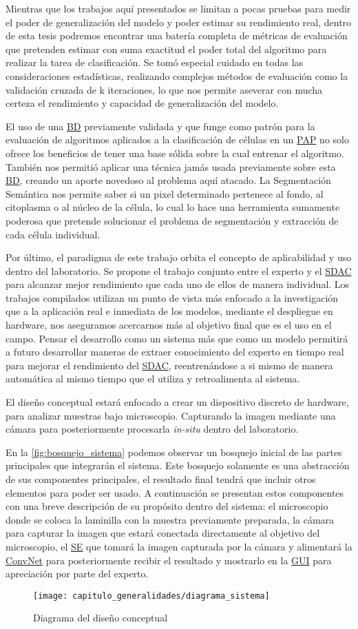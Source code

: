 Mientras que los trabajos aquí presentados se limitan a pocas pruebas para medir
el poder de generalización del modelo y poder estimar su rendimiento real,
dentro de esta tesis podremos encontrar una batería completa de métricas de
evaluación que pretenden estimar con suma exactitud el poder total del algoritmo
para realizar la tarea de clasificación. Se tomó especial cuidado en todas las
consideraciones estadísticas, realizando complejos métodos de evaluación como la
validación cruzada de k iteraciones, lo que nos permite aseverar con mucha
certeza el rendimiento y capacidad de generalización del modelo.

El uso de una \hyperlink{abbr}{BD} previamente validada y que funge como patrón
para la evaluación de algoritmos aplicados a la clasificación de células en un
\hyperlink{abbr}{PAP} no solo ofrece los beneficios de tener una base sólida
sobre la cual entrenar el algoritmo. También nos permitió aplicar una técnica
jamás usada previamente sobre esta \hyperlink{abbr}{BD}, creando un aporte
novedoso al problema aquí atacado. La Segmentación Semántica nos permite saber
si un pixel determinado pertenece al fondo, al citoplasma o al núcleo de la
célula, lo cual lo hace una herramienta sumamente poderosa que pretende
solucionar el problema de segmentación y extracción de cada célula individual.

Por último, el paradigma de este trabajo orbita el concepto de aplicabilidad y
uso dentro del laboratorio. Se propone el trabajo conjunto entre el experto y el
\hyperlink{abbr}{SDAC} para alcanzar mejor rendimiento que cada uno de ellos de
manera individual. Los trabajos compilados utilizan un punto de vista más
enfocado a la investigación que a la aplicación real e inmediata de los modelos,
mediante el despliegue en hardware, nos aseguramos acercarnos más al objetivo
final que es el uso en el campo. Pensar el desarrollo como un sistema más que
como un modelo permitirá a futuro desarrollar maneras de extraer conocimiento
del experto en tiempo real para mejorar el rendimiento del
\hyperlink{abbr}{SDAC}, reentrenándose a si mismo de manera automática al mismo
tiempo que el utiliza y retroalimenta al sistema. 

El diseño conceptual estará enfocado a crear un dispositivo discreto de
hardware, para analizar muestras bajo microscopio. Capturando la imagen mediante
una cámara para posteriormente procesarla \emph{in-situ} dentro del laboratorio.

En la \autoref{fig:bosquejo_sistema} podemos observar un bosquejo inicial de las
partes principales que integrarán el sistema. Este bosquejo solamente es una
abstracción de sus componentes principales, el resultado final tendrá que
incluir otros elementos para poder ser usado. A continuación se presentan estos
componentes con una breve descripción de su propósito dentro del sistema: el
microscopio donde se coloca la laminilla con la muestra previamente preparada,
la cámara para capturar la imagen que estará conectada directamente al objetivo
del microscopio, el \hyperlink{abbr}{SE} que tomará la imagen capturada por la
cámara y alimentará la \hyperlink{abbr}{ConvNet} para posteriormente recibir el
resultado y mostrarlo en la \hyperlink{abbr}{GUI} para apreciación por parte del
experto.

\begin{figure}[H]
    \centering
    \texttt{[image: capitulo\_generalidades/diagrama\_sistema]}
    \caption{Diagrama del diseño conceptual}\label{fig:bosquejo_sistema}
\end{figure}